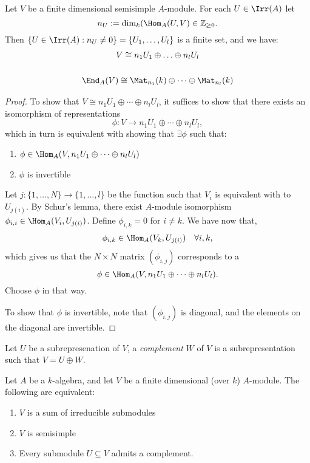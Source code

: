 \begin{prop}
Let \(V\) be a finite dimensional semisimple \(A\)-module. For each \(U\in \Irr(A)\) let
\[
n_U:=\dim_{k} (\Hom_A(U,V) \in  \Bbb{Z}_{\geq 0}.
\]
Then \(\{U\in \Irr(A) : n_U\neq 0\}=\{U_{1},\ldots ,U_{l}\}\) is a finite set, and we have:
\begin{gather*}
V\cong n_{1}U_{1}\oplus \ldots \oplus n_{l}U_{l} \\
\\
\End_A(V)\cong \Mat_{n_{1}}(k)\oplus \cdots \oplus \Mat_{n_{l}}(k)
\end{gather*}
\end{prop}

\begin{proof}
To show that \(V\cong n_{1}U_{1}\oplus \cdots \oplus n_{l}U_{l}\), it suffices to show that there exists an isomorphism of representations
\[
\phi :V\rightarrow n_{1}U_{1}\oplus \cdots \oplus n_{l}U_{l},
\]
which in turn is equivalent with showing that \(\exists \phi \) such that:

\begin{enumerate}
  \item \(\phi \in \Hom_A(V,n_{1}U_{1}\oplus \cdots \oplus n_{l}U_{l})\)
  \item \(\phi \) is invertible
\end{enumerate}

Let \(j:\{1,\ldots ,N\}\rightarrow \{1,\ldots ,l\}\) be the function such that \(V_{i}\) is equivalent with to \(U_{j(i)}\). By Schur's lemma, there exist \(A\)-module isomorphism \(\phi _{i,i}\in \Hom_A(V_{i},U_{j(i)})\). Define \(\phi _{i,k}=0\) for \(i\neq k\). We have now that,
\begin{align*}
\phi _{i,k}\in \Hom_A(V_{k},U_{j(i)}) &&\forall i,k,
\end{align*}
which gives us that the \(N\times N\) matrix \((\phi _{i,j})\) corresponds to a
\[
\phi \in \Hom_A(V,n_{1}U_{1}\oplus \cdots \oplus n_{l}U_{l}).
\]
Choose \(\phi \) in that way.

To show that \(\phi \) is invertible, note that \((\phi _{i,j})\) is diagonal, and the elements on the diagonal are invertible.
\end{proof}


\begin{defn}
Let \(U\) be a subrepresenation of \(V\), a \emph{complement} \(W\) of \(V\) is a subrepresentation such that \(V=U\oplus W\).
\end{defn}

\begin{prop}
Let \(A\) be a \(k\)-algebra, and let \(V\) be a finite dimensional (over \(k\)) \(A\)-module. The following are equivalent:

\begin{enumerate}
  \item \(V\) is a sum of irreducible submodules
  \item \(V\) is semisimple
  \item Every submodule \(U\subseteq V\) admits a complement.
\end{enumerate}
\end{prop}


